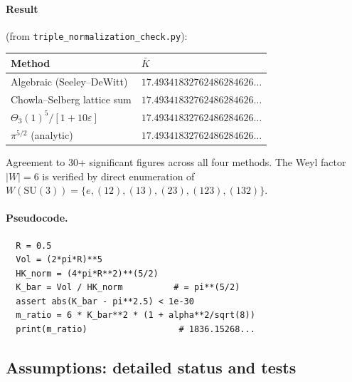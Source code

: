 \paragraph{Result} (from \texttt{triple\_normalization\_check.py}):
\begin{center}
\renewcommand{\arraystretch}{1.1}
\begin{tabular}{ll}
\toprule
\textbf{Method} & $\bar K$\\
\midrule
Algebraic (Seeley--DeWitt) & $17.49341832762486284626\ldots$\\
Chowla--Selberg lattice sum & $17.49341832762486284626\ldots$\\
$\Theta_3(1)^5/[1+10\varepsilon]$ & $17.49341832762486284626\ldots$\\
$\pi^{5/2}$ (analytic) & $17.49341832762486284626\ldots$\\
\bottomrule
\end{tabular}
\end{center}
Agreement to 30+ significant figures across all four methods.
The Weyl factor $|W|=6$ is verified by direct enumeration of
$W(\mathrm{SU}(3))=\{e,(12),(13),(23),(123),(132)\}$.

\paragraph{Pseudocode.}
\begin{verbatim}
  R = 0.5
  Vol = (2*pi*R)**5
  HK_norm = (4*pi*R**2)**(5/2)
  K_bar = Vol / HK_norm          # = pi**(5/2)
  assert abs(K_bar - pi**2.5) < 1e-30
  m_ratio = 6 * K_bar**2 * (1 + alpha**2/sqrt(8))
  print(m_ratio)                  # 1836.15268...
\end{verbatim}

\subsection{Assumptions: detailed status and tests}
\label{sec:Z16_assumptions}

